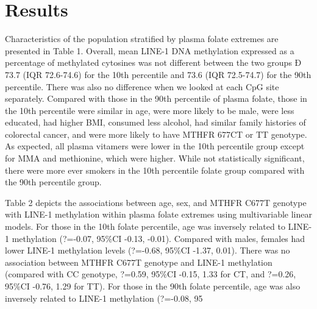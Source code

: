 \section{Results}
Characteristics of the population stratified by plasma folate extremes are presented in Table 1. Overall, mean LINE-1 DNA methylation expressed as a percentage of methylated cytosines was not different between the two groups Ð 73.7 (IQR 72.6-74.6) for the 10th percentile and 73.6 (IQR 72.5-74.7) for the 90th percentile. There was also no difference when we looked at each CpG site separately. Compared with those in the 90th percentile of plasma folate, those in the 10th percentile were similar in age, were more likely to be male, were less educated, had higher BMI, consumed less alcohol, had similar family histories of colorectal cancer, and were more likely to have MTHFR 677CT or TT genotype. As expected, all plasma vitamers were lower in the 10th percentile group except for MMA and methionine, which were higher. While not statistically significant, there were more ever smokers in the 10th percentile folate group compared with the 90th percentile group.

\noindent Table 2 depicts the associations between age, sex, and MTHFR C677T genotype with LINE-1 methylation within plasma folate extremes using multivariable linear models. For those in the 10th folate percentile, age was inversely related to LINE-1 methylation (?=-0.07, 95\%CI -0.13, -0.01). Compared with males, females had lower LINE-1 methylation levels (?=-0.68, 95\%CI -1.37, 0.01). There was no association between MTHFR C677T genotype and LINE-1 methylation (compared with CC genotype, ?=0.59, 95\%CI -0.15, 1.33 for CT, and ?=0.26, 95\%CI -0.76, 1.29 for TT). For those in the 90th folate percentile, age was also inversely related to LINE-1 methylation (?=-0.08, 95%


